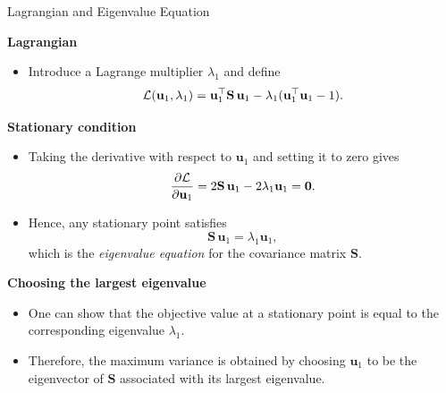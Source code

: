 \documentclass[9pt]{beamer}
\begin{document}
\begin{frame}{Lagrangian and Eigenvalue Equation}

\textbf{Lagrangian}
\begin{itemize}
  \item Introduce a Lagrange multiplier $\lambda_1$ and define
  \[
    \mathcal{L}(\mathbf{u}_1, \lambda_1)
    = \mathbf{u}_1^{\top}\mathbf{S}\,\mathbf{u}_1
      - \lambda_1(\mathbf{u}_1^{\top}\mathbf{u}_1 - 1).
  \]
\end{itemize}

\textbf{Stationary condition}
\begin{itemize}
  \item Taking the derivative with respect to $\mathbf{u}_1$ and setting it to zero gives
  \[
    \frac{\partial \mathcal{L}}{\partial \mathbf{u}_1}
    = 2\mathbf{S}\,\mathbf{u}_1 - 2\lambda_1 \mathbf{u}_1
    = \mathbf{0}.
  \]
  \item Hence, any stationary point satisfies
  \[
    \mathbf{S}\,\mathbf{u}_1 = \lambda_1 \mathbf{u}_1,
  \]
  which is the \emph{eigenvalue equation} for the covariance matrix $\mathbf{S}$.
\end{itemize}

\textbf{Choosing the largest eigenvalue}
\begin{itemize}
  \item One can show that the objective value at a stationary point is equal to the corresponding eigenvalue $\lambda_1$.
  \item Therefore, the maximum variance is obtained by choosing $\mathbf{u}_1$ to be the eigenvector of $\mathbf{S}$ associated with its largest eigenvalue.
\end{itemize}

\end{frame}
\end{document}
